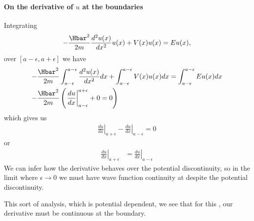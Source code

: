 {\paragraph{On the derivative of \(u\) at the boundaries}
%
Integrating
%
\begin{equation}\label{eqn:PHY356Lecture9:20}
\begin{aligned}
-\frac{\Hbar^2 }{2m} \frac{d^2 u(x)}{dx^2} u(x) + V(x) u(x) = E u(x),
\end{aligned}
\end{equation}
%
over \([a-\epsilon,a+\epsilon]\) we have
%
\begin{equation}\label{eqn:PHY356Lecture9:21}
\begin{aligned}
-\frac{\Hbar^2 }{2m} &
\int_{a-\epsilon}^{a-\epsilon}
\frac{d^2 u(x)}{dx^2} dx
+
\int_{a-\epsilon}^{a-\epsilon}
V(x) u(x) dx =
\int_{a-\epsilon}^{a-\epsilon}
E u(x) dx \\
-\frac{\Hbar^2 }{2m} &
\left(
\left.\frac{du}{dx}\right\vert_{a-\epsilon}^{a+\epsilon} + 0 = 0
\right)
\end{aligned}
\end{equation}
%
which gives us
%
\begin{equation}\label{eqn:PHY356Lecture9:22}
\begin{aligned}
\left.\frac{du}{dx}\right\vert_{a + \epsilon}
-\left.\frac{du}{dx}\right\vert_{a - \epsilon} = 0
\end{aligned}
\end{equation}
%
or
\begin{equation}\label{eqn:PHY356Lecture9:23}
\begin{aligned}
\left.\frac{du}{dx}\right\vert_{a + \epsilon}
&=
\left.\frac{du}{dx}\right\vert_{a - \epsilon}
\end{aligned}
\end{equation}
%
We can infer how the derivative behaves over the potential discontinuity, so in the limit where \(\epsilon \rightarrow 0\) we must have wave function continuity at despite the potential discontinuity.

This sort of analysis, which is potential dependent, we see that for this , our derivative must be continuous at the boundary.

} %

